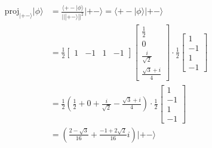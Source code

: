 \begin{align*}
    \mathrm{proj}_{|+-\rangle}|\phi\rangle & = \frac{\langle+-|\phi\rangle}{|||+-\rangle||^2} |+-\rangle = \langle+-|\phi\rangle |+-\rangle                                \\
                                           & = \frac{1}{2}\begin{bmatrix}
                                                              1 & -1 & 1 & -1
                                                          \end{bmatrix}
    \begin{bmatrix}
        \frac{1}{2}        \\
        0                  \\
        \frac{i}{\sqrt{2}} \\
        \frac{\sqrt{3}+i}{4}
    \end{bmatrix}
    \cdot \frac{1}{2}\begin{bmatrix}
                         1  \\
                         -1 \\
                         1  \\
                         -1
                     \end{bmatrix}                                                                                                                                \\
                                           & = \frac{1}{2}\left(\frac{1}{2} + 0 + \frac{i}{\sqrt{2}} - \frac{\sqrt{3}+i}{4}\right) \cdot \frac{1}{2}\begin{bmatrix}
                                                                                                                                                        1  \\
                                                                                                                                                        -1 \\
                                                                                                                                                        1  \\
                                                                                                                                                        -1
                                                                                                                                                    \end{bmatrix} \\
                                           & =  \left(\frac{2 - \sqrt{3}}{16} + \frac{-1 + 2\sqrt{2}}{16}i\right)|+-\rangle
\end{align*}
